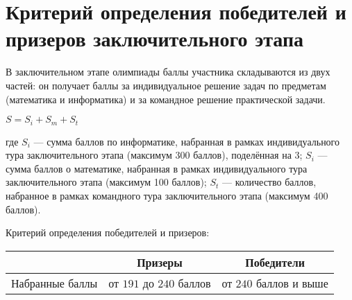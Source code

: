 \section{Критерий определения победителей и призеров
заключительного этапа}

В заключительном этапе олимпиады баллы участника складываются
из двух частей: он получает баллы за индивидуальное решение задач по
предметам (математика и информатика) и за командное решение
практической задачи.

\begin{center}
    $S = S_i + S_m + S_t$
\end{center}

где $S_i$ --- сумма баллов по информатике, набранная в рамках индивидуального
тура заключительного этапа (максимум 300 баллов), поделённая на 3; $S_i$ ---
сумма баллов о математике, набранная в рамках индивидуального тура
заключительного этапа (максимум 100 баллов); $S_t$ --- количество баллов,
набранное в рамках командного тура заключительного этапа (максимум
400 баллов).

Критерий определения победителей и призеров:

\begin{center}
\begin{tabular}{ |c|c|c| }
 \hline
  & \textbf{Призеры} & \textbf{Победители} \\
 \hline
 Набранные баллы & от $191$ до $240$ баллов & от $240$ баллов и выше \\
 \hline
\end{tabular}
\end{center}
